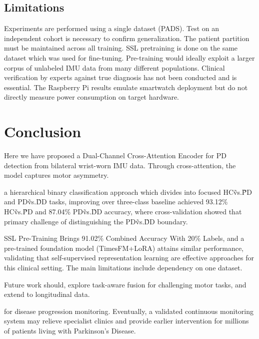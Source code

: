 \documentclass[pmlr]{jmlr}
\begin{document}
\subsection{Limitations}
Experiments are performed using a single dataset (PADS). Test on an independent cohort is necessary to confirm generalization. 
The patient partition must be maintained across all training. SSL pretraining is done on the same dataset which was used for fine-tuning. Pre-training would ideally exploit a larger corpus of unlabeled IMU data from many different populations. Clinical verification by experts against true diagnosis has not been conducted and is essential. The Raspberry Pi results emulate smartwatch deployment but do not directly measure power consumption on target hardware.

 


\section{Conclusion}
\label{sec:conclusion}

Here we have proposed a Dual-Channel Cross-Attention Encoder for PD detection from bilateral wrist-worn IMU data. Through cross-attention, the model captures motor asymmetry.

a hierarchical binary classification approach which divides into focused HC\~vs.\~PD and PD\~vs.\~DD tasks, improving over three-class baseline achieved 93.12\% HC\~vs.\~PD and 87.04\% PD\~vs.\~DD accuracy, where cross-validation showed that primary challenge of distinguishing the PD\~vs.\~DD boundary.

SSL Pre-Training Brings 91.02\% Combined Accuracy With 20\% Labels, and a pre-trained foundation model (TimesFM+LoRA) attains similar performance, validating that self-supervised representation learning are effective approaches for this clinical setting. The main limitations include dependency on one dataset. 

Future work should, explore task-aware fusion for challenging motor tasks, and extend to longitudinal data.

for disease progression monitoring. Eventually, a validated continuous monitoring system may relieve specialist clinics and provide earlier intervention for millions of patients living with Parkinson’s Disease.
\end{document}
